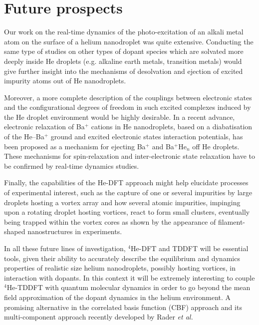 \section*{Future prospects}
Our work on the real-time dynamics of the photo-excitation of an alkali metal atom on the surface of a helium nanodroplet was quite extensive. Conducting the same type of studies on other types of dopant species which are solvated more deeply inside He droplets (e.g. alkaline earth metals, transition metals) would give further insight into the mechanisms of desolvation and ejection of excited impurity atoms out of He nanodroplets\citep{Loginov:2007,Loginov:2012, Kautsch:2013,Lindebner:2014}.

Moreover, a more complete description of the couplings between electronic states and the configurational degrees of freedom in such excited complexes induced by the He droplet environment would be highly desirable\citep{Closser:2014,Masson:2014}. In a recent advance, electronic relaxation of Ba$^+$ cations in He nanodroplets, based on a diabatisation of the He–Ba$^+$ ground and excited electronic states interaction potentials\citep{Vindel:2018}, has been proposed as a mechanism for ejecting Ba$^+$ and Ba$^+$He$_n$ off He droplets. These mechanisms for spin-relaxation and inter-electronic state relaxation have to be confirmed by real-time dynamics studies.

Finally, the capabilities of the He-DFT approach might help elucidate processes of experimental interest, such as the capture of one or several impurities by large droplets hosting a vortex array and how several atomic impurities, impinging upon a rotating droplet hosting vortices, react to form small clusters, eventually being trapped within the vortex cores as shown by the appearance of filament-shaped nanostructures in experiments.

In all these future lines of investigation, $^4$He-DFT and TDDFT will be essential tools, given their ability to accurately describe the equilibrium and dynamics properties of realistic size helium nanodroplets, possibly hosting vortices, in interaction with dopants. In this context it will be extremely interesting to couple $^4$He-TDDFT with quantum molecular dynamics in order to go beyond the mean field approximation of the dopant dynamics in the helium environment. A promising alternative in the correlated basis function (CBF) approach and its multi-component approach recently developed by Rader \textit{et al.}\citep{Rader2017}